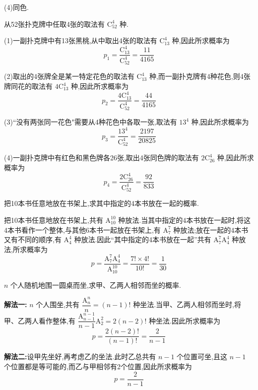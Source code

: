 (4)同色.

\begin{solution}
    从52张扑克牌中任取4张的取法有 $\mathrm{C}_{52}^4$ 种.

    (1)一副扑克牌中有13张黑桃,从中取出4张的取法有 $\mathrm{C}_{13}^4$ 种,因此所求概率为
    $$
    p_1 = \dfrac{\mathrm{C}_{13}^4}{\mathrm{C}_{52}^4} = \dfrac{11}{4165}
    $$

    (2)取出的4张牌全是某一特定花色的取法有 $\mathrm{C}_{13}^4$ 种,而一副扑克牌有4种花色,则4张牌同花的取法有 $4 \mathrm{C}_{13}^4$ 种,因此所求概率为
    $$
    p_2 = \dfrac{4 \mathrm{C}_{13}^4}{\mathrm{C}_{52}^4} = \dfrac{44}{4165}
    $$

    (3)``没有两张同一花色"需要从4种花色中各取一张,取法有 $13^4$ 种,因此所求概率为
    $$
    p_3 = \dfrac{13^4}{\mathrm{C}_{52}^4} = \dfrac{2197}{20825}
    $$

    (4)一副扑克牌中有红色和黑色牌各26张,取出4张同色牌的取法有 $2 \mathrm{C}_{26}^4$ 种,因此所求概率为
    $$
    p_4 = \dfrac{2 \mathrm{C}_{26}^4}{\mathrm{C}_{52}^4} = \dfrac{92}{833}
    $$
\end{solution}

\question 把10本书任意地放在书架上,求其中指定的4本书放在一起的概率.

\begin{solution}
    把10本书任意地放在书架上,共有 $\mathrm{A}_{10}^{10}$ 种放法.当其中指定的4本书放在一起时,将这4本书看作一个整体,与其他6本书一起放在书架上,有 $\mathrm{A}_7^7$ 种放法;放在一起的4本书又有不同的顺序,有 $\mathrm{A}_4^4$ 种放法.因此``其中指定的4本书放在一起''共有 $\mathrm{A}_7^7 \mathrm{A}_4^4$ 种放法,所求概率为
    $$
    p = \dfrac{\mathrm{A}_7^7 \mathrm{A}_4^4}{\mathrm{A}_{10}^{10}} = \dfrac{7! \times 4!}{10!} = \dfrac{1}{30}
    $$
\end{solution}

\question $n$ 个人随机地围一圆桌而坐,求甲、乙两人相邻而坐的概率.

\begin{solution}

    \textbf{解法一:} $n$ 个人围坐,共有 $\dfrac{\mathrm{A}_n^n}{n} = (n-1)!$ 种坐法.当甲、乙两人相邻而坐时,将甲、乙两人看作整体,有 $\dfrac{\mathrm{A}_{n-1}^{n-1}}{n-1} \mathrm{A}_2^2 = 2(n-2)!$ 种坐法.因此所求概率为
    $$
    p = \dfrac{2(n-2)!}{(n-1)!} = \dfrac{2}{n-1}
    $$

    \textbf{解法二:}设甲先坐好,再考虑乙的坐法.此时乙总共有 $n-1$ 个位置可坐,且这 $n-1$ 个位置都是等可能的,而乙与甲相邻有2个位置,因此所求概率为
    $$
    p = \dfrac{2}{n-1}
    $$
\end{solution}

